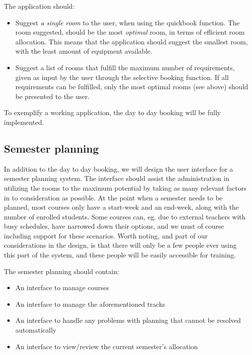 The application should:

\begin{itemize}
	\item Suggest \emph{a single room} to the user, when using the quickbook function. The room suggested, should be the most \emph{optimal} room, in terms of efficient room allocation. This means that the application should suggest the smallest room, with the least amount of equipment available.
	\item Suggest a list of rooms that fulfill the maximum number of requirements, given as input by the user through the selective booking function. If all requirements can be fulfilled, only the most optimal rooms (see above) should be presented to the user.
\end{itemize}

To exemplify a working application, the day to day booking will be fully implemented.

\subsection{Semester planning}
In addition to the day to day booking, we will design the user interface for a semester planning system. The interface should assist the administration in utilizing the rooms to the maximum potential by taking as many relevant factors in to consideration as possible. At the point when a semester needs to be planned, most courses only have a start-week and an end-week, along with the number of enrolled students. Some courses can, eg. due to external teachers with busy schedules, have narrowed down their options, and we must of course including support for these scenarios.
Worth noting, and part of our considerations in the design, is that there will only be a few people ever using this part of the system, and these people will be easily accessible for training.

The semester planning should contain:

\begin{itemize}
	\item An interface to manage courses
	\item An interface to manage the aforementioned tracks
	\item An interface to handle any problems with planning that cannot be resolved automatically
	\item An interface to view/review the current semester's allocation
\end{itemize}

